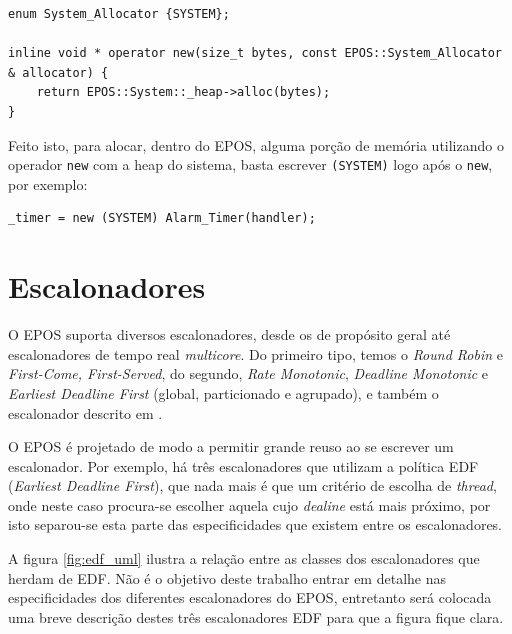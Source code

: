 \begin{lstlisting}
enum System_Allocator {SYSTEM};

inline void * operator new(size_t bytes, const EPOS::System_Allocator & allocator) {
    return EPOS::System::_heap->alloc(bytes);
}
\end{lstlisting}

Feito isto, para alocar, dentro do EPOS, alguma porção de memória utilizando o operador \verb+new+ com a heap do sistema, basta escrever \verb+(SYSTEM)+ logo após o \verb+new+, por exemplo:

\begin{lstlisting}
_timer = new (SYSTEM) Alarm_Timer(handler);
\end{lstlisting}


\section{Escalonadores}


O EPOS suporta diversos escalonadores, desde os de propósito geral até escalonadores de tempo real \emph{multicore}.
Do primeiro tipo, temos o \emph{Round Robin} e \emph{First-Come, First-Served}, do segundo, \emph{Rate Monotonic}, \emph{Deadline Monotonic} e \emph{Earliest Deadline First} (global, particionado e agrupado), e também o escalonador descrito em \cite{gio}.


O EPOS é projetado de modo a permitir grande reuso ao se escrever um escalonador. Por exemplo, há três escalonadores que utilizam a política EDF (\emph{Earliest Deadline First}), que nada mais é que um critério de escolha de \emph{thread}, onde neste caso procura-se escolher aquela cujo \emph{dealine} está mais próximo, por isto separou-se esta parte das especificidades que existem entre os escalonadores. 

A figura \ref{fig:edf_uml} ilustra a relação entre as classes dos escalonadores que herdam de EDF.  Não é o objetivo deste trabalho entrar em detalhe nas especificidades dos diferentes escalonadores do EPOS, entretanto será colocada uma breve descrição destes três escalonadores EDF para que a figura fique clara.

